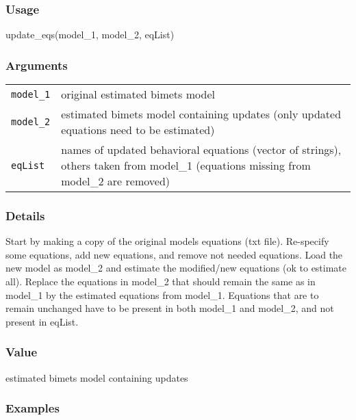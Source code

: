 \documentclass[
  letterpaper,
  DIV=11,
  numbers=noendperiod]{scrreport}
\newenvironment{Shaded}{\begin{snugshade}}{\end{snugshade}}
\newcommand{\FunctionTok}[1]{\textcolor[rgb]{0.28,0.35,0.67}{#1}}
\newcommand{\NormalTok}[1]{\textcolor[rgb]{0.00,0.23,0.31}{#1}}
\begin{document}
\subsubsection{Usage}\label{usage-85}

\begin{Shaded}
\begin{Highlighting}[]
\FunctionTok{update\_eqs}\NormalTok{(model\_1, model\_2, eqList)}
\end{Highlighting}
\end{Shaded}

\subsubsection{Arguments}\label{arguments-85}

\begin{longtable}[]{@{}ll@{}}
\toprule\noalign{}
\endhead
\bottomrule\noalign{}
\endlastfoot
\texttt{model\_1} & original estimated bimets model \\
\texttt{model\_2} & estimated bimets model containing updates (only
updated equations need to be estimated) \\
\texttt{eqList} & names of updated behavioral equations (vector of
strings), others taken from model\_1 (equations missing from model\_2
are removed) \\
\end{longtable}

\subsubsection{Details}\label{details-23}

Start by making a copy of the original model\textquotesingle s equations
(txt file). Re-specify some equations, add new equations, and remove not
needed equations. Load the new model as model\_2 and estimate the
modified/new equations (ok to estimate all). Replace the equations in
model\_2 that should remain the same as in model\_1 by the estimated
equations from model\_1. Equations that are to remain unchanged have to
be present in both model\_1 and model\_2, and not present in eqList.

\subsubsection{Value}\label{value-72}

estimated bimets model containing updates

\subsubsection{Examples}\label{examples-84}
\end{document}
